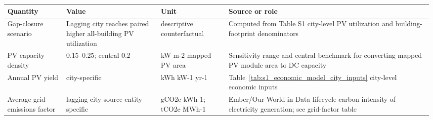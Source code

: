 \begin{tabular}{@{}p{3.0cm}p{3.0cm}p{2.2cm}p{5.2cm}@{}}
\toprule
Quantity & Value & Unit & Source or role \\
\midrule
Gap-closure scenario & Lagging city reaches paired higher all-building PV utilization & descriptive counterfactual & Computed from Table S1 city-level PV utilization and building-footprint denominators \\
PV capacity density & 0.15--0.25; central 0.2 & kW m-2 mapped PV area & Sensitivity range and central benchmark for converting mapped PV module area to DC capacity \\
Annual PV yield & city-specific & kWh kW-1 yr-1 & Table~\ref{tab:s1_economic_model_city_inputs} city-level economic inputs \\
Average grid-emissions factor & lagging-city source entity specific & gCO2e kWh-1; tCO2e MWh-1 & Ember/Our World in Data lifecycle carbon intensity of electricity generation; see grid-factor table \\
\bottomrule
\end{tabular}
